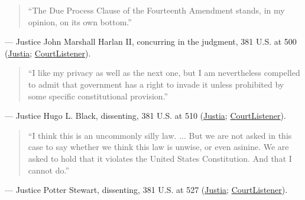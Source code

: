 \documentclass[12pt]{article}
\begin{document}
\begin{quote}
``The Due Process Clause of the Fourteenth Amendment stands, in my opinion, on its own bottom.''
\end{quote}
\noindent--- Justice John Marshall Harlan II, concurring in the judgment, 381 U.S. at 500 (\href{https://supreme.justia.com/cases/federal/us/381/479/}{Justia}; \href{https://www.courtlistener.com/opinion/107082/griswold-v-connecticut/}{CourtListener}).

\begin{quote}
``I like my privacy as well as the next one, but I am nevertheless compelled to admit that government has a right to invade it unless prohibited by some specific constitutional provision.''
\end{quote}
\noindent--- Justice Hugo L. Black, dissenting, 381 U.S. at 510 (\href{https://supreme.justia.com/cases/federal/us/381/479/}{Justia}; \href{https://www.courtlistener.com/opinion/107082/griswold-v-connecticut/}{CourtListener}).

\begin{quote}
``I think this is an uncommonly silly law. ... But we are not asked in this case to say whether we think this law is unwise, or even asinine. We are asked to hold that it violates the United States Constitution. And that I cannot do.''
\end{quote}
\noindent--- Justice Potter Stewart, dissenting, 381 U.S. at 527 (\href{https://supreme.justia.com/cases/federal/us/381/479/}{Justia}; \href{https://www.courtlistener.com/opinion/107082/griswold-v-connecticut/}{CourtListener}).
\end{document}
